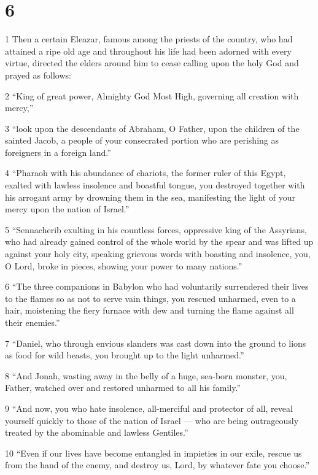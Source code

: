 \chapter{6}

\par 1 Then a certain Eleazar, famous among the priests of the country, who had attained a ripe old age and throughout his life had been adorned with every virtue, directed the elders around him to cease calling upon the holy God and prayed as follows:
\par 2 “King of great power, Almighty God Most High, governing all creation with mercy,”
\par 3 “look upon the descendants of Abraham, O Father, upon the children of the sainted Jacob, a people of your consecrated portion who are perishing as foreigners in a foreign land.”
\par 4 “Pharaoh with his abundance of chariots, the former ruler of this Egypt, exalted with lawless insolence and boastful tongue, you destroyed together with his arrogant army by drowning them in the sea, manifesting the light of your mercy upon the nation of Israel.”
\par 5 “Sennacherib exulting in his countless forces, oppressive king of the Assyrians, who had already gained control of the whole world by the spear and was lifted up against your holy city, speaking grievous words with boasting and insolence, you, O Lord, broke in pieces, showing your power to many nations.”
\par 6 “The three companions in Babylon who had voluntarily surrendered their lives to the flames so as not to serve vain things, you rescued unharmed, even to a hair, moistening the fiery furnace with dew and turning the flame against all their enemies.”
\par 7 “Daniel, who through envious slanders was cast down into the ground to lions as food for wild beasts, you brought up to the light unharmed.”
\par 8 “And Jonah, wasting away in the belly of a huge, sea-born monster, you, Father, watched over and restored unharmed to all his family.”
\par 9 “And now, you who hate insolence, all-merciful and protector of all, reveal yourself quickly to those of the nation of Israel — who are being outrageously treated by the abominable and lawless Gentiles.”
\par 10 “Even if our lives have become entangled in impieties in our exile, rescue us from the hand of the enemy, and destroy us, Lord, by whatever fate you choose.”
